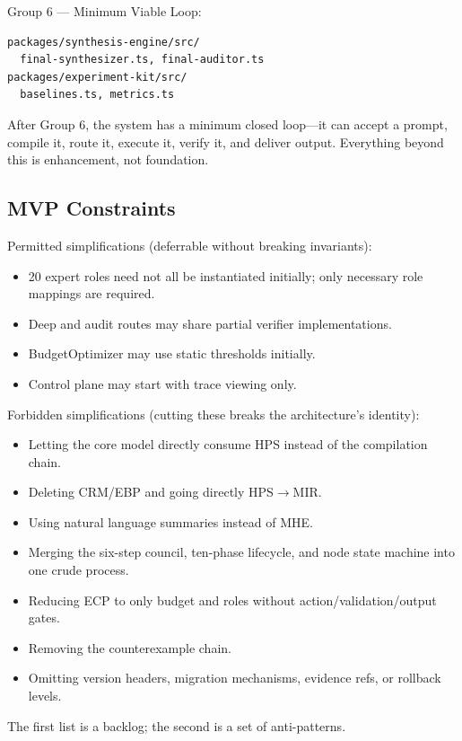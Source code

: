 \documentclass[12pt,a4paper]{article}
\begin{document}
Group 6 --- Minimum Viable Loop:
\begin{verbatim}
packages/synthesis-engine/src/
  final-synthesizer.ts, final-auditor.ts
packages/experiment-kit/src/
  baselines.ts, metrics.ts
\end{verbatim}


After Group 6, the system has a minimum closed loop---it can accept a prompt, compile it, route it, execute it, verify it, and deliver output. Everything beyond this is enhancement, not foundation.

\subsection{MVP Constraints}


Permitted simplifications (deferrable without breaking invariants):
\begin{itemize}
  \item 20 expert roles need not all be instantiated initially; only necessary role mappings are required.
  \item Deep and audit routes may share partial verifier implementations.
  \item BudgetOptimizer may use static thresholds initially.
  \item Control plane may start with trace viewing only.
\end{itemize}


Forbidden simplifications (cutting these breaks the architecture's identity):
\begin{itemize}
  \item Letting the core model directly consume HPS instead of the compilation chain.
  \item Deleting CRM/EBP and going directly HPS$\rightarrow$MIR.
  \item Using natural language summaries instead of MHE.
  \item Merging the six-step council, ten-phase lifecycle, and node state machine into one crude process.
  \item Reducing ECP to only budget and roles without action/validation/output gates.
  \item Removing the counterexample chain.
  \item Omitting version headers, migration mechanisms, evidence refs, or rollback levels.
\end{itemize}


The first list is a backlog; the second is a set of anti-patterns.
\end{document}
